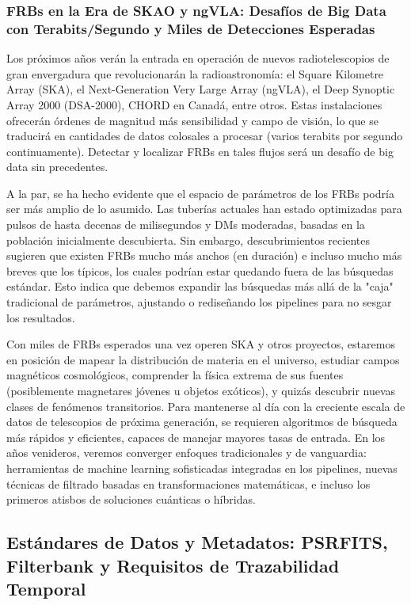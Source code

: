 \subsubsection{FRBs en la Era de SKAO y ngVLA: Desafíos de Big Data con Terabits/Segundo y Miles de Detecciones Esperadas}

Los próximos años verán la entrada en operación de nuevos radiotelescopios de gran envergadura que revolucionarán la radioastronomía: el Square Kilometre Array (SKA), el Next-Generation Very Large Array (ngVLA), el Deep Synoptic Array 2000 (DSA-2000), CHORD en Canadá, entre otros. Estas instalaciones ofrecerán órdenes de magnitud más sensibilidad y campo de visión, lo que se traducirá en cantidades de datos colosales a procesar (varios terabits por segundo continuamente). Detectar y localizar FRBs en tales flujos será un desafío de big data sin precedentes.

A la par, se ha hecho evidente que el espacio de parámetros de los FRBs podría ser más amplio de lo asumido. Las tuberías actuales han estado optimizadas para pulsos de hasta decenas de milisegundos y DMs moderadas, basadas en la población inicialmente descubierta. Sin embargo, descubrimientos recientes sugieren que existen FRBs mucho más anchos (en duración) e incluso mucho más breves que los típicos, los cuales podrían estar quedando fuera de las búsquedas estándar. Esto indica que debemos expandir las búsquedas más allá de la "caja" tradicional de parámetros, ajustando o rediseñando los pipelines para no sesgar los resultados.

Con miles de FRBs esperados una vez operen SKA y otros proyectos, estaremos en posición de mapear la distribución de materia en el universo, estudiar campos magnéticos cosmológicos, comprender la física extrema de sus fuentes (posiblemente magnetares jóvenes u objetos exóticos), y quizás descubrir nuevas clases de fenómenos transitorios. Para mantenerse al día con la creciente escala de datos de telescopios de próxima generación, se requieren algoritmos de búsqueda más rápidos y eficientes, capaces de manejar mayores tasas de entrada. En los años venideros, veremos converger enfoques tradicionales y de vanguardia: herramientas de machine learning sofisticadas integradas en los pipelines, nuevas técnicas de filtrado basadas en transformaciones matemáticas, e incluso los primeros atisbos de soluciones cuánticas o híbridas.

\subsection{Estándares de Datos y Metadatos: PSRFITS, Filterbank y Requisitos de Trazabilidad Temporal}

